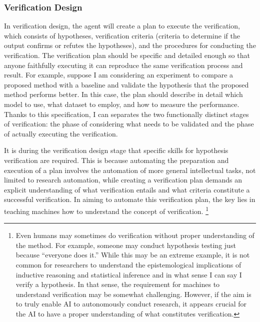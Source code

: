 \subsubsection{Verification Design} 
In verification design, the agent will create a plan to execute the verification, which consists of hypotheses, verification criteria (criteria to determine if the output confirms or refutes the hypotheses), and the procedures for conducting the verification. The verification plan should be specific and detailed enough so that anyone faithfully executing it can reproduce the same verification process and result. For example, suppose I am considering an experiment to compare a proposed method with a baseline and validate the hypothesis that the proposed method performs better. In this case, the plan should describe in detail which model to use, what dataset to employ, and how to measure the performance. Thanks to this specification, I can separates the two functionally distinct stages of verification: the phase of considering what needs to be validated and the phase of actually executing the verification.

It is during the verification design stage that specific skills for hypothesis verification are required. This is because automating the preparation and execution of a plan involves the automation of more general intellectual tasks, not limited to research automation, while creating a verification plan demands an explicit understanding of what verification entails and what criteria constitute a successful verification. In aiming to automate this verification plan, the key lies in teaching machines how to understand the concept of verification. \footnote{
Even humans may sometimes do verification without proper understanding of the method. For example, someone may conduct hypothesis testing just because ``everyone does it.'' While this may be an extreme example, it is not common for researchers to understand the epistemological implications of inductive reasoning and statistical inference and in what sense I can say I verify a hypothesis. In that sense, the requirement for machines to understand verification may be somewhat challenging. However, if the aim is to truly enable AI to autonomously conduct research, it appears crucial for the AI to have a proper understanding of what constitutes verification.
}



